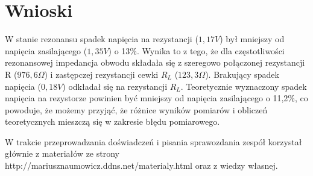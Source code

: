 \documentclass[polish,a4paper]{article}
\begin{document}
\section{Wnioski}
W stanie rezonansu spadek napięcia na rezystancji ($1,17V$) był mniejszy od napięcia zasilającego ($1,35V$) o 13\%. Wynika to z tego, że dla częstotliwości rezonansowej impedancja obwodu składała się z szeregowo połączonej rezystancji R ($976,6\Omega$) i zastępczej rezystancji cewki $R_L$ ($123,3\Omega$). Brakujący spadek napięcia ($0,18V$) odkładał się na rezystancji $R_L$.
Teoretycznie wyznaczony spadek napięcia na rezystorze powinien być mniejszy od napięcia zasilającego o 11,2\%, co powoduje, że możemy przyjąć, że różnice wyników pomiarów i obliczeń teoretycznych mieszczą się w zakresie błędu pomiarowego.




\begin{thebibliography}{9}

  W trakcie przeprowadzania doświadczeń i pisania sprawozdania zespół korzystał głównie z materiałów ze strony http://mariusznaumowicz.ddns.net/materialy.html oraz z wiedzy własnej.

\end{thebibliography}
\end{document}
